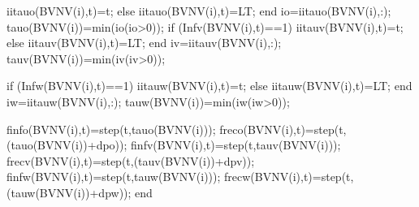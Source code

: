                                               iitauo(BVNV(i),t)=t;                                              
                                          else
                                              iitauo(BVNV(i),t)=LT;
                                          end 
                                          io=iitauo(BVNV(i),:);
                                          tauo(BVNV(i))=min(io(io>0));
                                          if (Infv(BVNV(i),t)==1)                                              
                                              iitauv(BVNV(i),t)=t;                                           
                                          else
                                              iitauv(BVNV(i),t)=LT;                                             
                                          end
                                          iv=iitauv(BVNV(i),:);
                                          tauv(BVNV(i))=min(iv(iv>0));
                                          
                                          if (Infw(BVNV(i),t)==1)                                              
                                              iitauw(BVNV(i),t)=t;                                           
                                          else
                                              iitauw(BVNV(i),t)=LT;                                             
                                          end
                                          iw=iitauw(BVNV(i),:);
                                          tauw(BVNV(i))=min(iw(iw>0));
                                          
                                          finfo(BVNV(i),t)=step(t,tauo(BVNV(i))); %
                                          freco(BVNV(i),t)=step(t,(tauo(BVNV(i))+dpo)); %
                                          finfv(BVNV(i),t)=step(t,tauv(BVNV(i))); %
                                          frecv(BVNV(i),t)=step(t,(tauv(BVNV(i))+dpv)); %
                                          finfw(BVNV(i),t)=step(t,tauw(BVNV(i))); %
                                          frecw(BVNV(i),t)=step(t,(tauw(BVNV(i))+dpw)); %
                                    end
                                    
